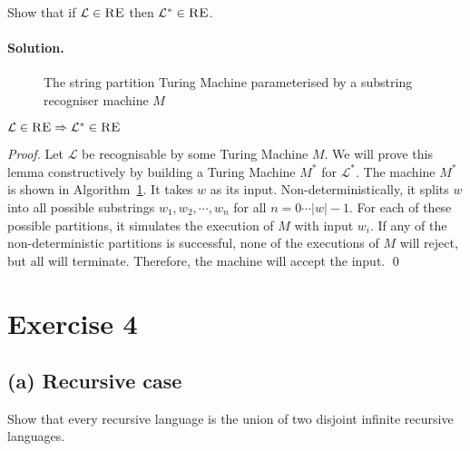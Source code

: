\documentclass[11pt]{llncs}
\begin{document}
Show that if $\mathcal{L} \in \textsc{RE}$ then $\mathcal{L}^* \in \textsc{RE}$.

\paragraph{Solution.}

\begin{figure}[t]
\begin{algorithm}[H]
  \caption{\label{alg.3}
      The string partition Turing Machine parameterised by
      a substring recogniser machine $M$
  }
  \begin{algorithmic}[1]
                \State{}
            \EndIf
        \EndFor
        \State{}
      \EndFunction
  \end{algorithmic}
\end{algorithm}
\end{figure}

\begin{lemma}
$\mathcal{L} \in \textsc{RE} \Rightarrow \mathcal{L}^* \in \textsc{RE}$
\end{lemma}
\begin{proof}
Let $\mathcal{L}$ be recognisable by some Turing Machine $M$. We will prove this
lemma constructively by building a Turing Machine $M^*$ for $\mathcal{L}^*$. The
machine $M^*$ is shown in Algorithm~\ref{alg.3}. It takes $w$ as its input.
Non-deterministically, it splits $w$ into all possible substrings $w_1, w_2,
\cdots, w_n$ for all $n = 0 \cdots |w| - 1$. For each of these possible
partitions, it simulates the execution of $M$ with input $w_i$. If any of the
non-deterministic partitions is successful, none of the executions of $M$ will
reject, but all will terminate. Therefore, the machine will accept the input.
\qed
\end{proof}

\section*{Exercise 4}

\subsection*{(a) Recursive case}
Show that every recursive language is the union of two disjoint infinite
recursive languages.
\end{document}
